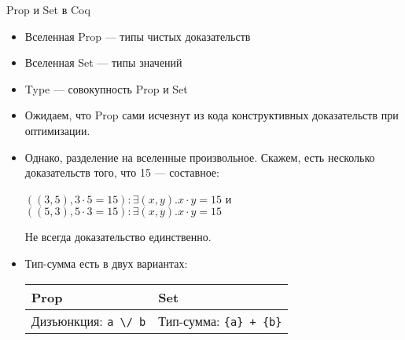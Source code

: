 \documentclass[aspectratio=169,dvipsnames,usenames]{beamer}
\begin{document}
\begin{frame}[fragile]{Prop и Set в Coq}
\begin{itemize}
\item Вселенная Prop --- типы чистых доказательств
\item Вселенная Set --- типы значений
\item Type --- совокупность Prop и Set
\item Ожидаем, что Prop сами исчезнут из кода конструктивных доказательств при оптимизации.

\item Однако, разделение на вселенные произвольное. Скажем, есть несколько доказательств того, что 15 --- составное:

$((3,5),3 \cdot 5 = 15) : \exists (x,y).x \cdot y = 15$
и
$((5,3),5 \cdot 3 = 15) : \exists (x,y).x \cdot y = 15$

Не всегда доказательство единственно.

\item Тип-сумма есть в двух вариантах:

\begin{center}\begin{tabular}{ll}
Prop & Set \\\hline
Дизъюнкция: \verb!a \/ b! & Тип-сумма: \verb!{a} + {b}!
\end{tabular}\end{center}
\end{itemize}

\begin{comment}
\small\color[HTML]{025002}
\begin{verbatim}
Inductive diveucl a b : Set :=
  divex : forall q r, b > r -> a = q * b + r -> diveucl a b.

Lemma eucl_dev : forall n, n > 0 -> forall m:nat, diveucl m n.

Lemma quotient :
  forall n,
    n > 0 ->
    forall m:nat, {q : nat | exists r : nat, m = q * n + r /\ n > r}.
\end{verbatim}
\end{comment}
\end{frame}
\end{document}
